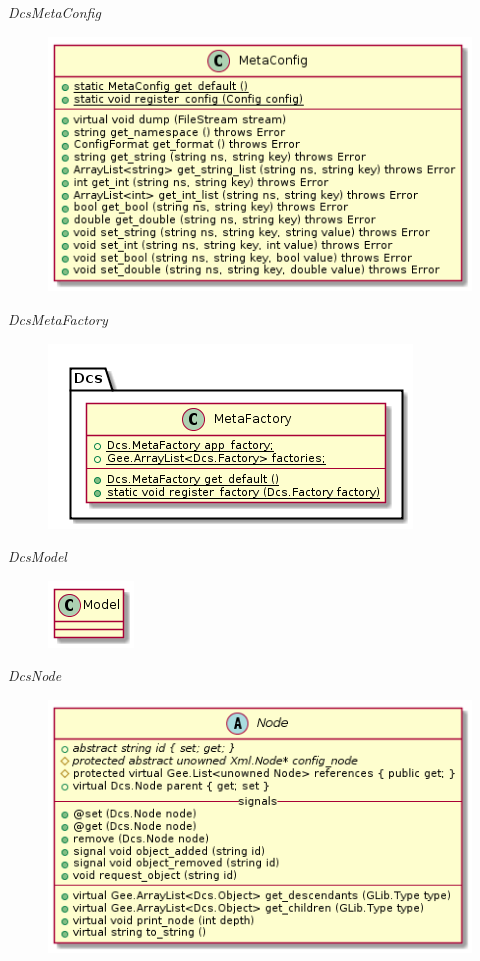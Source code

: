       \emph{DcsMetaConfig}

        \begin{figure}[H]
          \includegraphics{figures/design/class/core/meta-config}
        \end{figure}

      \emph{DcsMetaFactory}

        \begin{figure}[H]
          \includegraphics{figures/design/class/core/meta-factory}
        \end{figure}

      \emph{DcsModel}

        \begin{figure}[H]
          \includegraphics{figures/design/class/core/model}
        \end{figure}

      \emph{DcsNode}

        \begin{figure}[H]
          \includegraphics{figures/design/class/core/node}
        \end{figure}

